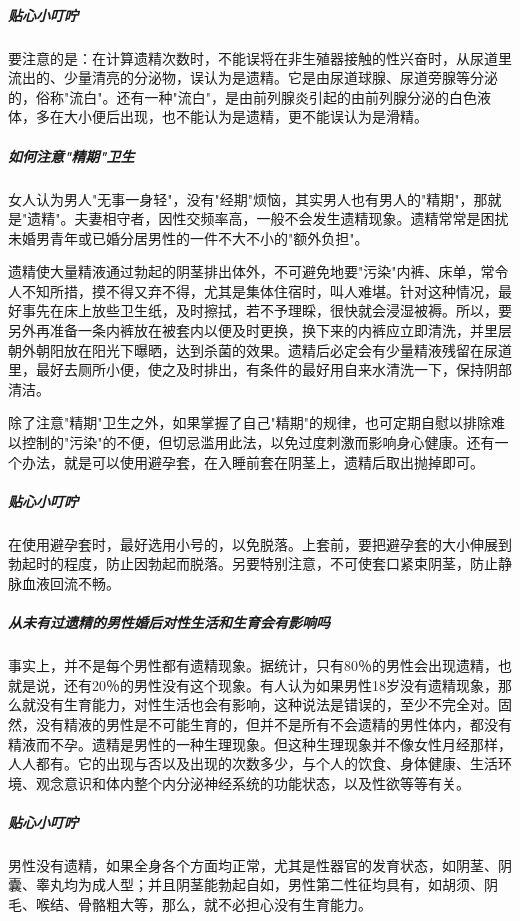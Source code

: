 \subparagraph{贴心小叮咛}

要注意的是：在计算遗精次数时，不能误将在非生殖器接触的性兴奋时，从尿道里流出的、少量清亮的分泌物，误认为是遗精。它是由尿道球腺、尿道旁腺等分泌的，俗称"流白"。还有一种"流白"，是由前列腺炎引起的由前列腺分泌的白色液体，多在大小便后出现，也不能认为是遗精，更不能误认为是滑精。

\subparagraph{如何注意"精期"卫生}

女人认为男人"无事一身轻"，没有"经期"烦恼，其实男人也有男人的"精期"，那就是"遗精"。夫妻相守者，因性交频率高，一般不会发生遗精现象。遗精常常是困扰未婚男青年或已婚分居男性的一件不大不小的"额外负担"。

遗精使大量精液通过勃起的阴茎排出体外，不可避免地要"污染"内裤、床单，常令人不知所措，摸不得又弃不得，尤其是集体住宿时，叫人难堪。针对这种情况，最好事先在床上放些卫生纸，及时擦拭，若不予理睬，很快就会浸湿被褥。所以，要另外再准备一条内裤放在被套内以便及时更换，换下来的内裤应立即清洗，并里层朝外朝阳放在阳光下曝晒，达到杀菌的效果。遗精后必定会有少量精液残留在尿道里，最好去厕所小便，使之及时排出，有条件的最好用自来水清洗一下，保持阴部清洁。

除了注意"精期"卫生之外，如果掌握了自己"精期"的规律，也可定期自慰以排除难以控制的"污染"的不便，但切忌滥用此法，以免过度刺激而影响身心健康。还有一个办法，就是可以使用避孕套，在入睡前套在阴茎上，遗精后取出抛掉即可。

\subparagraph{贴心小叮咛}

在使用避孕套时，最好选用小号的，以免脱落。上套前，要把避孕套的大小伸展到勃起时的程度，防止因勃起而脱落。另要特别注意，不可使套口紧束阴茎，防止静脉血液回流不畅。

\subparagraph{从未有过遗精的男性婚后对性生活和生育会有影响吗}

事实上，并不是每个男性都有遗精现象。据统计，只有80％的男性会出现遗精，也就是说，还有20％的男性没有这个现象。有人认为如果男性18岁没有遗精现象，那么就没有生育能力，对性生活也会有影响，这种说法是错误的，至少不完全对。固然，没有精液的男性是不可能生育的，但并不是所有不会遗精的男性体内，都没有精液而不孕。遗精是男性的一种生理现象。但这种生理现象并不像女性月经那样，人人都有。它的出现与否以及出现的次数多少，与个人的饮食、身体健康、生活环境、观念意识和体内整个内分泌神经系统的功能状态，以及性欲等等有关。

\subparagraph{贴心小叮咛}

男性没有遗精，如果全身各个方面均正常，尤其是性器官的发育状态，如阴茎、阴囊、睾丸均为成人型；并且阴茎能勃起自如，男性第二性征均具有，如胡须、阴毛、喉结、骨骼粗大等，那么，就不必担心没有生育能力。

